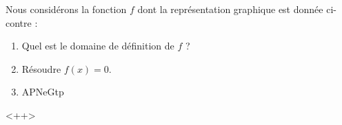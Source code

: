 
\begin{exercice}\label{exosmath-0566}

    Nous considérons la fonction \( f\) dont la représentation graphique est donnée ci-contre :

    \begin{enumerate}
        \item
            Quel est le domaine de définition de \( f\) ?
        \item
            Résoudre \( f(x)=0\).
        \item
APNeGtp

    \end{enumerate}
    <++>

\end{exercice}
